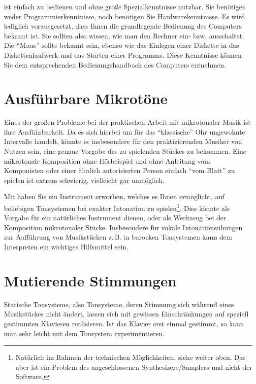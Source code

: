 \mutabor{} ist einfach zu bedienen und ohne große Spezialkenntnisse
nutzbar. Sie benötigen weder Programmierkenntnisse, noch benötigen Sie
Hardwarekenntnisse. Es wird lediglich vorausgesetzt, dass Ihnen die
grundlegende Bedienung des Computers bekannt ist. Sie sollten also
wissen, wie man den Rechner ein- bzw. ausschaltet. Die "`Maus"' sollte
bekannt sein, ebenso wie das Einlegen einer Diskette in das
Diskettenlaufwerk und das Starten eines Programms. Diese Kenntnisse
können Sie dem entsprechenden Bedienungshandbuch des Computers
entnehmen.

\section{Ausführbare Mikrotöne}\label{sec:ausf-mikr}
Eines der großen Probleme bei der praktischen Arbeit mit
mikrotonaler Musik ist ihre Ausführbarkeit. Da es sich hierbei um
für das "`klassische"' Ohr ungewohnte Intervalle handelt, könnte es
insbesondere für den praktizierenden Musiker von Nutzen sein, eine
genaue Vorgabe des zu spielenden Stückes zu bekommen. Eine
mikrotonale Komposition ohne Hörbeispiel und ohne Anleitung vom
Komponisten oder einer ähnlich autorisierten Person 
einfach  "`vom Blatt"' zu spielen ist extrem schwierig, 
vielleicht gar unmöglich.

Mit \mutabor{} haben Sie ein Instrument erworben,
welches es Ihnen er\-mög\-licht, auf beliebigen Tonsystemen bei
exakter Intonation zu spielen\footnote{Natürlich im Rahmen der
technischen Möglichkeiten, siehe weiter oben. Das aber ist ein
Problem des angeschlossenen Synthesizers/Samplers und nicht der
Software.}. Dies könnte als Vorgabe für ein natürliches Instrument
dienen, oder als Werkzeug bei der Komposition mikrotonaler Stücke.
Insbesondere für vokale Intonationsübungen zur Aufführung von
Musikstücken z.\,B. in barocken Tonsystemen kann \mutabor{} dem
Interpreten ein wichtiges Hilfsmittel sein.

\section{Mutierende Stimmungen}\label{sec:muti-stimm}

Statische Tonsysteme, also Tonsysteme, deren Stimmung sich
während eines Musikstückes nicht ändert, lassen sich mit gewissen
Einschränkungen auf speziell gestimmten Klavieren realisieren. Ist
das Klavier erst einmal gestimmt, so kann man sehr leicht mit dem
Tonsystem experimentieren.

